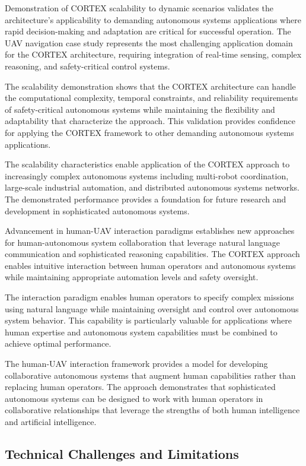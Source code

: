 Demonstration of CORTEX scalability to dynamic scenarios validates the architecture's applicability to demanding autonomous systems applications where rapid decision-making and adaptation are critical for successful operation. The UAV navigation case study represents the most challenging application domain for the CORTEX architecture, requiring integration of real-time sensing, complex reasoning, and safety-critical control systems.

The scalability demonstration shows that the CORTEX architecture can handle the computational complexity, temporal constraints, and reliability requirements of safety-critical autonomous systems while maintaining the flexibility and adaptability that characterize the approach. This validation provides confidence for applying the CORTEX framework to other demanding autonomous systems applications.

The scalability characteristics enable application of the CORTEX approach to increasingly complex autonomous systems including multi-robot coordination, large-scale industrial automation, and distributed autonomous systems networks. The demonstrated performance provides a foundation for future research and development in sophisticated autonomous systems.

Advancement in human-UAV interaction paradigms establishes new approaches for human-autonomous system collaboration that leverage natural language communication and sophisticated reasoning capabilities. The CORTEX approach enables intuitive interaction between human operators and autonomous systems while maintaining appropriate automation levels and safety oversight.

The interaction paradigm enables human operators to specify complex missions using natural language while maintaining oversight and control over autonomous system behavior. This capability is particularly valuable for applications where human expertise and autonomous system capabilities must be combined to achieve optimal performance.

The human-UAV interaction framework provides a model for developing collaborative autonomous systems that augment human capabilities rather than replacing human operators. The approach demonstrates that sophisticated autonomous systems can be designed to work with human operators in collaborative relationships that leverage the strengths of both human intelligence and artificial intelligence.

\subsection{Technical Challenges and Limitations}

